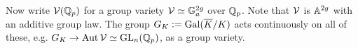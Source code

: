 Now write $\mathcal{V}(\mathbb{Q}_p)$ for a group variety $\mathcal{V} \simeq \mathbb{G}_a^{2g}$ over $\mathbb{Q}_p$. Note that $\mathcal{V}$ is $\mathbb{A}^{2g}$ with an additive group law. The group $G_K:= \operatorname{Gal}(\overline{K}/K)$ acts continuously on all of these, e.g. $G_K \to \operatorname{Aut} \mathcal{V} \simeq \operatorname{GL}_n(\mathbb{Q}_p)$, as a group variety. 

























